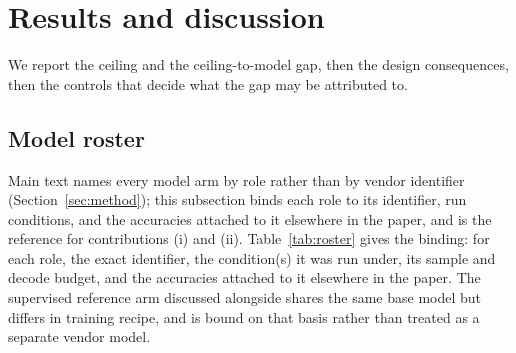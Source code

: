 \section{Results and discussion} \label{sec:experiments} We report the ceiling and the ceiling-to-model gap,
then the design consequences, then the controls that decide what the gap may be attributed to.
\subsection{Model roster}
\label{sec:roster}
Main text names every model arm by role rather than by vendor identifier (Section~\ref{sec:method}); this
subsection binds each role to its identifier, run conditions, and the accuracies attached to it elsewhere in
the paper, and is the reference for contributions (i) and (ii).
Table~\ref{tab:roster} gives the binding: for each role, the exact identifier, the condition(s) it was run
under, its sample and decode budget, and the accuracies attached to it elsewhere in the paper. The
supervised reference arm discussed alongside \rlFinetuned{} shares the same base model but differs in
training recipe, and is bound on that basis rather than treated as a separate vendor model.


